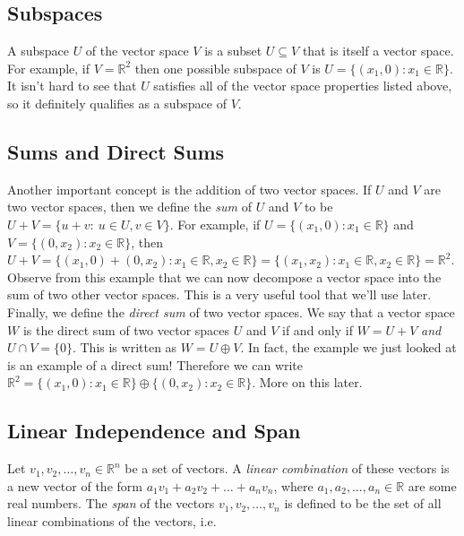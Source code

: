 \documentclass[12pt]{article}
\begin{document}
\subsection*{Subspaces}

A subspace $U$ of the vector space $V$ is a subset $U \subseteq V$ that is itself a vector space. For example, if $V = \mathbb{R}^2$ then one possible subspace of $V$ is $U = \{ (x_1, 0) : x_1 \in \mathbb{R} \}$. It isn't hard to see that $U$ satisfies all of the vector space properties listed above, so it definitely qualifies as a subspace of $V$. 

\subsection*{Sums and Direct Sums}

Another important concept is the addition of two vector spaces. If $U$ and $V$ are two vector spaces, then we define the \textit{sum} of $U$ and $V$ to be $U + V = \{ u + v : \: u \in U, v \in V \}$. For example, if $U = \{ (x_1, 0) : x_1 \in \mathbb{R} \}$ and $V = \{ (0, x_2) : x_2 \in \mathbb{R} \}$, then $U + V = \{ (x_1, 0) + (0, x_2) : x_1 \in \mathbb{R}, x_2 \in \mathbb{R} \} = \{ (x_1, x_2) : x_1 \in \mathbb{R}, x_2 \in \mathbb{R} \} = \mathbb{R}^2$. Observe from this example that we can now decompose a vector space into the sum of two other vector spaces. This is a very useful tool that we'll use later. Finally, we define the \textit{direct sum} of two vector spaces. We say that a vector space $W$ is the direct sum of two vector spaces $U$ and $V$ if and only if $W = U + V$ \textit{and} $U \cap V = \{0\}$. This is written as $W = U \oplus V$. In fact, the example we just looked at is an example of a direct sum! Therefore we can write $\mathbb{R}^2 = \{ (x_1, 0) : x_1 \in \mathbb{R} \} \oplus \{ (0, x_2) : x_2 \in \mathbb{R} \}$. More on this later.

\subsection*{Linear Independence and Span}

Let $v_1, v_2, \ldots, v_n \in \mathbb{R}^n$ be a set of vectors. A \textit{linear combination} of these vectors is a new vector of the form $a_1 v_1 + a_2 v_2 + \ldots + a_n v_n$, where $a_1, a_2, \ldots, a_n \in \mathbb{R}$ are some real numbers. The \textit{span} of the vectors $v_1, v_2, \ldots, v_n $ is defined to be the set of all linear combinations of the vectors, i.e.
\end{document}
